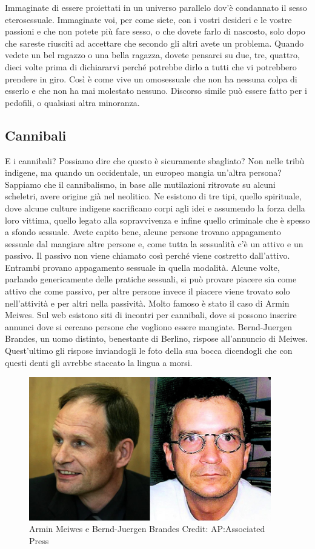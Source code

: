 \documentclass[12pt]{book} %
\begin{document}
Immaginate di essere proiettati in un universo parallelo dov'è condannato il sesso eterosessuale.
Immaginate voi, per come siete, con i vostri desideri e le vostre passioni e che non potete più fare sesso, o che
dovete farlo di nascosto, solo dopo che sareste riusciti ad accettare che secondo gli altri avete un problema. Quando
vedete un bel ragazzo o una bella ragazza, dovete pensarci su due, tre, quattro, dieci volte prima di dichiararvi
perché potrebbe dirlo a tutti che vi potrebbero prendere in giro. Così è come vive un omosessuale che non ha nessuna
colpa di esserlo e che non ha mai molestato nessuno. Discorso simile può essere fatto per i pedofili, o qualsiasi altra
minoranza.

\subsection{Cannibali}
E i cannibali? Possiamo dire che questo è sicuramente sbagliato? Non nelle tribù indigene, ma quando un occidentale, un
europeo mangia un'altra persona? Sappiamo che il cannibalismo, in base alle mutilazioni ritrovate
su alcuni scheletri, avere origine già nel neolitico. Ne esistono di tre tipi, quello spirituale, dove alcune culture
indigene sacrificano corpi agli idei e assumendo la forza della loro vittima, quello legato alla sopravvivenza e infine
quello criminale che è spesso a sfondo sessuale. Avete capito bene, alcune persone trovano appagamento sessuale dal
mangiare altre persone e, come tutta la sessualità c'è un attivo e un passivo. Il passivo non
viene chiamato così perché viene costretto dall'attivo. Entrambi provano appagamento sessuale in
quella modalità. Alcune volte, parlando genericamente delle pratiche sessuali, si può provare piacere sia come attivo
che come passivo, per altre persone invece il piacere viene trovato solo nell'attività e per altri
nella passività. Molto famoso è stato il caso di Armin Meiwes. Sul web esistono siti di incontri per cannibali, dove si
possono inserire annunci dove si cercano persone che vogliono essere mangiate. Bernd-Juergen Brandes, un uomo distinto,
benestante di Berlino, rispose all'annuncio di Meiwes. Quest'ultimo gli
rispose inviandogli le foto della sua bocca dicendogli che con questi denti gli avrebbe staccato la lingua a morsi. 

\begin{figure}
\includegraphics[width=10.552cm,height=6.258cm]{images/Libro-img055.jpg}
\caption*{Armin Meiwes e Bernd-Juergen Brandes Credit: AP:Associated Press}
\end{figure}
\end{document}

